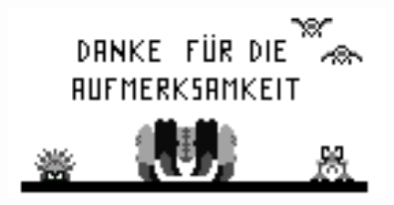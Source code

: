 \documentclass[fleqn]{beamer}
\begin{document}
    \begin{frame}
    		\includegraphics[width=11cm]{Bilder/aufmerksamkeit.png}
    \end{frame}
   
\end{document}

